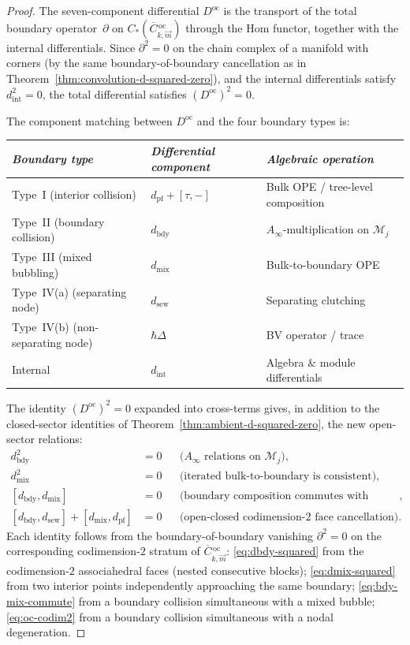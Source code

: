 \begin{proof}
The seven-component differential $D^{\mathrm{oc}}$ is the
transport of the total boundary operator~$\partial$ on
$C_*(\overline{C}{}^{\,\mathrm{oc}}_{k,\vec{m}})$ through
the Hom functor, together with the internal differentials.
Since $\partial^2 = 0$ on the chain complex of a manifold with
corners (by the same boundary-of-boundary cancellation as in
Theorem~\ref{thm:convolution-d-squared-zero}), and the
internal differentials satisfy $d_{\mathrm{int}}^2 = 0$,
the total differential satisfies
$(D^{\mathrm{oc}})^2 = 0$.

The component matching between $D^{\mathrm{oc}}$ and the
four boundary types is:
\begin{center}
\renewcommand{\arraystretch}{1.2}
\begin{tabular}{lll}
\emph{Boundary type} & \emph{Differential component} &
  \emph{Algebraic operation} \\
\hline
Type~I (interior collision)
  & $d_{\mathrm{pf}} + [\tau, -]$
  & Bulk OPE / tree-level composition \\
Type~II (boundary collision)
  & $d_{\mathrm{bdy}}$
  & $A_\infty$-multiplication on $\mathcal{M}_j$ \\
Type~III (mixed bubbling)
  & $d_{\mathrm{mix}}$
  & Bulk-to-boundary OPE \\
Type~IV(a) (separating node)
  & $d_{\mathrm{sew}}$
  & Separating clutching \\
Type~IV(b) (non-separating node)
  & $\hbar\Delta$
  & BV operator / trace \\
Internal
  & $d_{\mathrm{int}}$
  & Algebra \& module differentials
\end{tabular}
\end{center}

The identity $(D^{\mathrm{oc}})^2 = 0$ expanded into
cross-terms gives, in addition to the closed-sector identities of
Theorem~\ref{thm:ambient-d-squared-zero}, the new open-sector
relations:
\begin{align}
d_{\mathrm{bdy}}^2 &= 0
  &&\text{($A_\infty$ relations on $\mathcal{M}_j$)},
  \label{eq:dbdy-squared} \\
d_{\mathrm{mix}}^2 &= 0
  &&\text{(iterated bulk-to-boundary is consistent)},
  \label{eq:dmix-squared} \\
[d_{\mathrm{bdy}}, d_{\mathrm{mix}}] &= 0
  &&\text{(boundary composition commutes with mixed bubbling)},
  \label{eq:bdy-mix-commute} \\
[d_{\mathrm{bdy}}, d_{\mathrm{sew}}]
+ [d_{\mathrm{mix}}, d_{\mathrm{pf}}] &= 0
  &&\text{(open-closed codimension-2 face cancellation)}.
  \label{eq:oc-codim2}
\end{align}
Each identity follows from the boundary-of-boundary vanishing
$\partial^2 = 0$ on the corresponding codimension-$2$ stratum
of $\overline{C}{}^{\,\mathrm{oc}}_{k,\vec{m}}$:
\eqref{eq:dbdy-squared} from the codimension-$2$ associahedral
faces (nested consecutive blocks);
\eqref{eq:dmix-squared} from two interior points independently
approaching the same boundary;
\eqref{eq:bdy-mix-commute} from a boundary collision simultaneous
with a mixed bubble;
\eqref{eq:oc-codim2} from a boundary collision simultaneous with
a nodal degeneration.


\end{proof}
